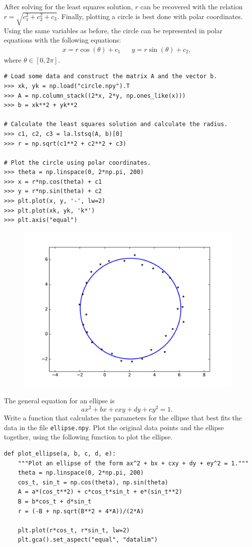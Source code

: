 After solving for the least squares solution, $r$ can be recovered with the relation $r = \sqrt{c_1^2 + c_2^2 + c_3}$.
Finally, plotting a circle is best done with polar coordinates.
Using the same variables as before, the circle can be represented in polar equations with the following equations:
\begin{align*}
x = r\cos(\theta) + c_1 && y = r\sin(\theta) + c_2,
\end{align*}
where $\theta \in [0, 2\pi]$.

\begin{lstlisting}
# Load some data and construct the matrix A and the vector b.
>>> xk, yk = np.load("circle.npy").T
>>> A = np.column_stack((2*x, 2*y, np.ones_like(x)))
>>> b = xk**2 + yk**2

# Calculate the least squares solution and calculate the radius.
>>> c1, c2, c3 = la.lstsq(A, b)[0]
>>> r = np.sqrt(c1**2 + c2**2 + c3)

# Plot the circle using polar coordinates.
>>> theta = np.linspace(0, 2*np.pi, 200)
>>> x = r*np.cos(theta) + c1
>>> y = r*np.sin(theta) + c2
>>> plt.plot(x, y, '-', lw=2)
>>> plt.plot(xk, yk, 'k*')
>>> plt.axis("equal")
\end{lstlisting}

\begin{figure}[H]
    \includegraphics[width=.55\textwidth]{figures/circle_fit_example.pdf}
\end{figure}

\begin{problem}
The general equation for an ellipse is \[ax^2 + bx + cxy + dy + ey^2 = 1.\]
Write a function that calculates the parameters for the ellipse that best fits the data in the file \texttt{ellipse.npy}.
Plot the original data points and the ellipse together, using the following function to plot the ellipse.

\begin{lstlisting}
def plot_ellipse(a, b, c, d, e):
    """Plot an ellipse of the form ax^2 + bx + cxy + dy + ey^2 = 1."""
    theta = np.linspace(0, 2*np.pi, 200)
    cos_t, sin_t = np.cos(theta), np.sin(theta)
    A = a*(cos_t**2) + c*cos_t*sin_t + e*(sin_t**2)
    B = b*cos_t + d*sin_t
    r = (-B + np.sqrt(B**2 + 4*A))/(2*A)

    plt.plot(r*cos_t, r*sin_t, lw=2)
    plt.gca().set_aspect("equal", "datalim")
\end{lstlisting}
\end{problem}

